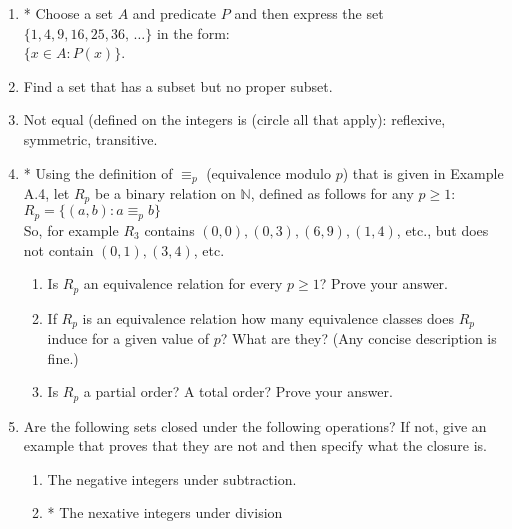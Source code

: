 \documentclass[10pt]{article}
\newcommand{\nat}{\mathbb{N}}
\begin{document}
\begin{enumerate}

\item
* Choose a set $A$ and predicate $P$ and then express the set $\{1, 4, 9, 16, 25, 36, \, \ldots \}$ in the form: \\
$\{x \in A : P(x)\}$.



\item
Find a set that has a subset but no proper subset.



\addtocounter{enumi}{1}
\item
Not equal (defined on the integers is (circle all that apply): reflexive, symmetric, transitive. 


\addtocounter{enumi}{1}
\item
* Using the definition of $\equiv _p$ (equivalence modulo $p$) that is given in Example A.4, let $R_p$ be a binary relation on $\nat$, defined as follows for any $p \geq 1$: \\
$R_p = \{(a, b): a \equiv _p b \}$ \\
So, for example $R_3$ contains $(0, 0), (0, 3), (6, 9), (1, 4)$, etc., but does not contain $(0, 1), (3, 4)$, etc.
\begin{enumerate}

\item
Is $R_p$ an equivalence relation for every $p \geq 1$? Prove your answer.

\item
If $R_p$ is an equivalence relation how many equivalence classes does $R_p$ induce for a given value of $p$? What are they?  (Any concise description is fine.)

\item
Is $R_p$ a partial order?  A total order?  Prove your answer.

\end{enumerate}



\addtocounter{enumi}{1}
\item
Are the following sets closed under the following operations?  If not, give an example that proves that they are not and then specify what the closure is.
\begin{enumerate}

\item
The negative integers under subtraction.

\item
* The nexative integers under division


\end{enumerate}
\end{enumerate}
\end{document}

